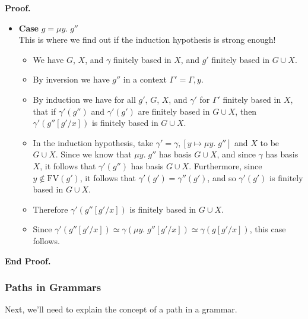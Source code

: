 \documentclass{article}
\newcommand{\fix}[2]{\mu {#1}.\;{#2}}
\newcommand{\lft}[1]{\left<{#1}\right.}
\newcommand{\rgt}[1]{\left.{#1}\right>}
\newcommand{\setof}[1]{\{{#1}\}}
\newcommand{\path}[2]{{#1}\rhd{#2}}
\newenvironment{proof}{\noindent\textbf{Proof.}}
{\noindent\textbf{End Proof.}}
\newenvironment{caseblock}{\begin{itemize}}{\end{itemize}}
\newenvironment{case}[1]{\item \textbf{Case} {#1}\\}{}
\begin{document}
\begin{proof}
\begin{caseblock}
  \begin{case}{$g = \fix{y}{g''}$}
    This is where we find out if the induction hypothesis is strong enough!
    \begin{itemize}
      \item We have $G$, $X$, and $\gamma$ finitely based in $X$, and $g'$ finitely
        based in $G \cup X$. 
      \item By inversion we have $g''$ in a context $\Gamma' = \Gamma, y$. 
      \item By induction we have for all $g'$, $G$, $X$, and $\gamma'$ for $\Gamma'$ finitely
        based in $X$, that if $\gamma'(g'')$ and $\gamma'(g')$ are finitely based in $G \cup X$,
        then $\gamma'(g''[g'/x])$ is finitely based in $G \cup X$. 
      \item In the induction hypothesis, take $\gamma' = \gamma, [y \mapsto \fix{y}{g''}]$ and 
        $X$ to be $G \cup X$. Since we know that $\fix{y}{g''}$ has basis $G \cup X$, and since
        $\gamma$ has basis $X$, it follows that $\gamma'(g'')$ has basis $G \cup X$. Furthermore, 
        since $y \not\in \mathrm{FV}(g')$, it follows that $\gamma'(g') = \gamma''(g')$, and 
        so $\gamma'(g')$ is finitely based in $G \cup X$. 
      \item Therefore $\gamma'(g''[g'/x])$ is finitely based in $G \cup X$. 
      \item Since $\gamma'(g''[g'/x]) \simeq\gamma(\fix{y}{g''[g'/x]}) \simeq \gamma(g[g'/x])$, 
        this case follows.         
    \end{itemize}
  \end{case}
\end{caseblock}
\end{proof}

\subsubsection{Paths in Grammars}
Next, we'll need to explain the concept of a path in a grammar.

\end{document}

